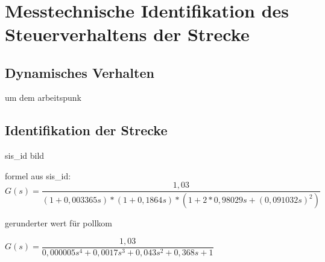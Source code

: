 
\newpage
[Perkowski]\\
\section{Messtechnische Identifikation des Steuerverhaltens der Strecke}


\subsection{Dynamisches Verhalten}
um dem arbeitspunk

\subsection{Identifikation der Strecke}

sis\_id bild


formel aus sis\_id: \\

$ G(s) = \dfrac{1,03}{(1 + 0,003365s) * (1 + 0,1864s) * (1 + 2*0,98029s + (0,091032s)^{2}) }$

gerunderter wert für pollkom

$ G(s) =  \dfrac{1,03}{0,000005s^{4} + 0,0017s^{3	} + 0,043s^{2} + 0,368s + 1 } $